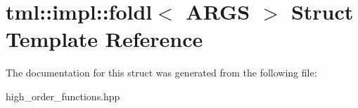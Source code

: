 \hypertarget{structtml_1_1impl_1_1foldl}{\section{tml\+:\+:impl\+:\+:foldl$<$ A\+R\+G\+S $>$ Struct Template Reference}
\label{structtml_1_1impl_1_1foldl}
}


The documentation for this struct was generated from the following file\+:\begin{DoxyCompactItemize}
\item 
high\+\_\+order\+\_\+functions.\+hpp\end{DoxyCompactItemize}
